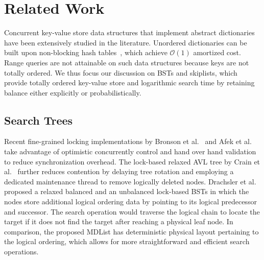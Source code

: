 \documentclass[10pt,conference,compsocconf]{IEEEtran}
\begin{document}
\section{Related Work}
\label{sec:related}
Concurrent key-value store data structures that implement abstract dictionaries have been extensively studied in the literature.
Unordered dictionaries can be built upon non-blocking hash tables~\cite{michael2002high}, which achieve $\mathcal{O}(1)$ amortized cost.
Range queries are not attainable on such data structures because keys are not totally ordered.
We thus focus our discussion on BSTs and skiplists, which provide totally ordered key-value store and logarithmic search time by retaining balance either explicitly or probabilistically.

\subsection{Search Trees}
Recent fine-grained locking implementations by Bronson et al.~\cite{bronson2010practical} and Afek et al.~\cite{afek2012cbtree} take advantage of optimistic concurrently control and hand over hand validation to reduce synchronization overhead. 
The lock-based relaxed AVL tree by Crain et al.~\cite{crain2013contention} further reduces contention by delaying tree rotation and employing a dedicated maintenance thread to remove logically deleted nodes.
Drachsler et al.~\cite{drachsler2014practical} proposed a relaxed balanced and an unbalanced lock-based BSTs in which the nodes store additional logical ordering data by pointing to its logical predecessor and successor.
The search operation would traverse the logical chain to locate the target if it does not find the target after reaching a physical leaf node.
In comparison, the proposed MDList has deterministic physical layout pertaining to the logical ordering, which allows for more straightforward and efficient search operations.
\end{document}
